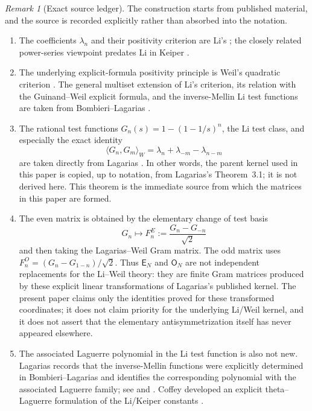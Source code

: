 \documentclass[11pt]{amsart}
\numberwithin{equation}{section}
\theoremstyle{plain}
\theoremstyle{definition}
\theoremstyle{remark}
\newtheorem{remark}[theorem]{Remark}
\newcommand{\E}{\mathsf E}
\newcommand{\Omat}{\mathsf O}
\begin{document}
\begin{remark}[Exact source ledger]
\label{rem:status_provenance}
The construction starts from published material, and the source is recorded explicitly rather than
absorbed into the notation.
\begin{enumerate}[label=(\alph*)]
\item The coefficients \(\lambda_n\) and their positivity criterion are Li's \cite{Li1997}; the
closely related power-series viewpoint predates Li in Keiper \cite{Keiper1992}.
\item The underlying explicit-formula positivity principle is Weil's quadratic criterion
\cite{Weil1952}.  The general multiset extension of Li's criterion, its relation with the
Guinand--Weil explicit formula, and the inverse-Mellin Li test functions are taken from
Bombieri--Lagarias \cite{BombieriLagarias1999}.
\item The rational test functions
\(G_n(s)=1-(1-1/s)^n\), the Li test class, and especially the exact identity
\[
\langle G_n,G_m\rangle_W=\lambda_n+\lambda_{-m}-\lambda_{n-m}
\]
are taken directly from Lagarias \cite[Section~3, Theorem~3.1]{Lagarias2007}.  In other words,
the parent kernel used in this paper is copied, up to notation, from Lagarias's Theorem~3.1; it is
not derived here.  This theorem is the immediate source from which the matrices in this paper are formed.
\item The even matrix is obtained by the elementary change of test basis
\[
G_n\longmapsto F_n^E:=\frac{G_n-G_{-n}}{\sqrt2}
\]
and then taking the Lagarias--Weil Gram matrix.  The odd matrix uses
\(F_n^O=(G_n-G_{1-n})/\sqrt2\).  Thus \(\E_N\) and \(\Omat_N\) are not independent replacements
for the Li--Weil theory: they are finite Gram matrices produced by these explicit linear
transformations of Lagarias's published kernel.  The present paper claims only the identities proved
for these transformed coordinates; it does not claim priority for the underlying Li/Weil kernel,
and it does not assert that the elementary antisymmetrization itself has never appeared elsewhere.
\item The associated Laguerre polynomial in the Li test function is also not new.  Lagarias records
that the inverse-Mellin functions were explicitly determined in Bombieri--Lagarias and identifies
the corresponding polynomial with the associated Laguerre family; see
\cite[Appendix~A]{Lagarias2007} and \cite{BombieriLagarias1999}.  Coffey developed an explicit
theta--Laguerre formulation of the Li/Keiper constants \cite{Coffey2007ThetaLaguerre}.

\end{enumerate}
\end{remark}
\end{document}
